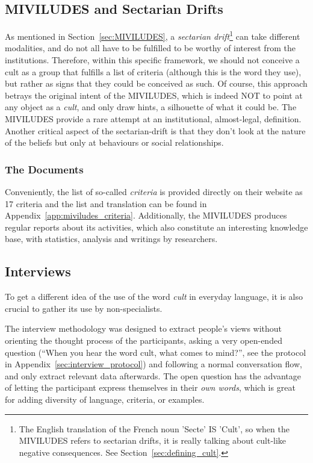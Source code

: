 \subsection{MIVILUDES and Sectarian Drifts}

As mentioned in Section~\ref{sec:MIVILUDES}, a \textit{sectarian drift}\footnote{
    The English translation of the French noun 'Secte' IS 'Cult', so when the MIVILUDES refers to sectarian drifts, it is really talking about cult-like negative consequences. See Section~\ref{sec:defining_cult}.
}
can take different modalities, and do not all have to be fulfilled to be worthy of interest from the institutions. Therefore, within this specific framework, we should not conceive a cult as a group that fulfills a list of criteria (although this is the word they use), but rather as signs that they could be conceived as such.
Of course, this approach betrays the original intent of the MIVILUDES, which is indeed NOT to point at any object as a \textit{cult}, and only draw hints, a silhouette of what it could be. The MIVILUDES provide a rare attempt at an institutional, almost-legal, definition.
Another critical aspect of the sectarian-drift is that they don't look at the nature of the beliefs but only at behaviours or social relationships.
\subsubsection{The Documents}
Conveniently, the list of so-called \textit{criteria} is provided directly on their website\autocite[]{CommentIdentifierDerive} as 17 criteria and the list and translation can be found in Appendix~\ref{app:miviludes_criteria}.
Additionally, the MIVILUDES produces regular reports about its activities, which also constitute an interesting knowledge base, with statistics, analysis and writings by researchers.

\subsection{Interviews}
To get a different idea of the use of the word \textit{cult} in everyday language, it is also crucial to gather its use by non-specialists.

The interview methodology was designed to extract people's views without orienting the thought process of the participants, asking a very open-ended question (\enquote{When you hear the word cult, what comes to mind?}, see the protocol in Appendix~\ref{sec:interview_protocol}) and following a normal conversation flow, and only extract relevant data afterwards.
The open question has the advantage of letting the participant express themselves in their \textit{own words}, which is great for adding diversity of language, criteria, or examples.

